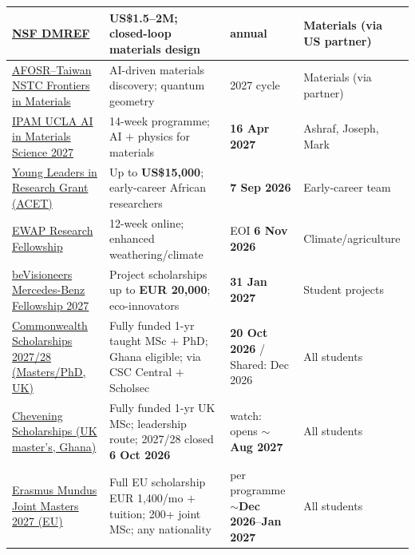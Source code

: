 \documentclass[11pt,a4paper]{article}
\begin{document}
\begin{longtable}{@{}p{3.4cm}p{5.6cm}p{2.2cm}p{2.7cm}@{}}
\midrule
\href{https://www.nsf.gov/funding/opportunities/dmref-designing-materials-revolutionize-engineer-our-future}{NSF DMREF} & \textbf{US\$1.5--2M}; closed-loop materials design & annual & Materials (via US partner) \\
\midrule
\href{https://ord.ntcu.edu.tw/storage/media/24zz853RTpNndvOfI8OZAvRPgQ1k6EcE2kNbVxJ9.pdf}{AFOSR--Taiwan NSTC Frontiers in Materials} & AI-driven materials discovery; quantum geometry & 2027 cycle & Materials (via partner) \\
\midrule
\href{https://atomgrants.com/grant/artificial-intelligence-materials-science-institute-for-pure-and-applied-mathematics}{IPAM UCLA AI in Materials Science 2027} & 14-week programme; AI $+$ physics for materials & \textbf{16 Apr 2027} & Ashraf, Joseph, Mark \\
\midrule
\href{https://www2.fundsforngos.org/leadership/young-leaders-in-research-grant-for-early-career-african-researchers/}{Young Leaders in Research Grant (ACET)} & Up to \textbf{US\$15{,}000}; early-career African researchers & \textbf{7 Sep 2026} & Early-career team \\
\midrule
\href{https://ewap-project.org/fellowship}{EWAP Research Fellowship} & 12-week online; enhanced weathering/climate & EOI \textbf{6 Nov 2026} & Climate/agriculture \\
\midrule
\href{https://opportunitypool.org/apply-for-the-bevisioneers-mercedes-benz-fellowship-2027fully-funded/}{beVisioneers Mercedes-Benz Fellowship 2027} & Project scholarships up to \textbf{EUR 20{,}000}; eco-innovators & \textbf{31 Jan 2027} & Student projects \\
\midrule
\href{https://cscuk.fcdo.gov.uk/scholarships}{Commonwealth Scholarships 2027/28 (Masters/PhD, UK)} & Fully funded 1-yr taught MSc $+$ PhD; Ghana eligible; via CSC Central $+$ Scholsec & \textbf{20 Oct 2026} / Shared: Dec 2026 & All students \\
\midrule
\href{https://www.chevening.org/scholarships}{Chevening Scholarships (UK master's, Ghana)} & Fully funded 1-yr UK MSc; leadership route; 2027/28 closed \textbf{6 Oct 2026} & watch: opens $\sim$\textbf{Aug 2027} & All students \\
\midrule
\href{https://erasmus-plus.ec.europa.eu/opportunities/individuals/students/erasmus-mundus-joint-masters}{Erasmus Mundus Joint Masters 2027 (EU)} & Full EU scholarship EUR 1{,}400/mo $+$ tuition; 200+ joint MSc; any nationality & per programme $\sim$\textbf{Dec 2026}--\textbf{Jan 2027} & All students \\

\end{longtable}
\end{document}
